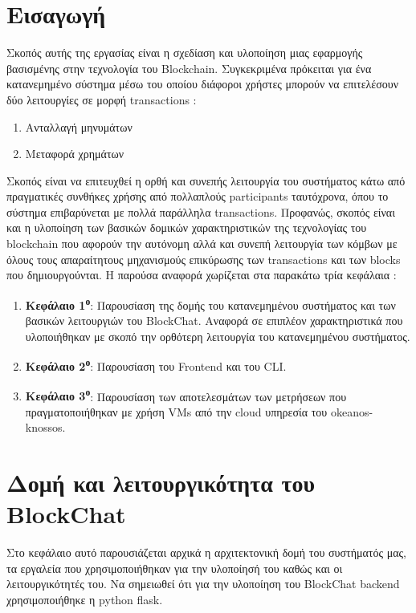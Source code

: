 \documentclass[12pt, a4paper]{article}
\begin{document}
	\section*{Εισαγωγή}
	Σκοπός αυτής της εργασίας είναι η σχεδίαση και υλοποίηση μιας εφαρμογής βασισμένης στην τεχνολογία του Blockchain. Συγκεκριμένα πρόκειται για ένα κατανεμημένο σύστημα μέσω του οποίου διάφοροι χρήστες μπορούν να επιτελέσουν δύο λειτουργίες σε μορφή transactions : 
	\begin{enumerate}
		\item Ανταλλαγή μηνυμάτων 
		\item Μεταφορά χρημάτων
	\end{enumerate}
	Σκοπός είναι να επιτευχθεί η ορθή και συνεπής λειτουργία του συστήματος κάτω από πραγματικές συνθήκες χρήσης από πολλαπλούς participants ταυτόχρονα, όπου το σύστημα επιβαρύνεται με πολλά παράλληλα transactions. Προφανώς, σκοπός είναι και η υλοποίηση των βασικών δομικών χαρακτηριστικών της τεχνολογίας του blockchain που αφορούν την αυτόνομη αλλά και συνεπή λειτουργία των κόμβων με όλους τους απαραίτητους μηχανισμούς επικύρωσης των transactions και των blocks που δημιουργούνται.
	Η παρούσα αναφορά χωρίζεται στα παρακάτω τρία κεφάλαια :
	\begin{enumerate}
		\item \textbf{Κεφάλαιο 1\textsuperscript{ο}}: Παρουσίαση της δομής του κατανεμημένου συστήματος και των βασικών λειτουργιών του BlockChat. Αναφορά σε επιπλέον χαρακτηριστικά που υλοποιήθηκαν με σκοπό την ορθότερη λειτουργία του κατανεμημένου συστήματος.
		\item \textbf{Κεφάλαιο 2\textsuperscript{ο}}: Παρουσίαση του Frontend και του CLI. 
		\item \textbf{Κεφάλαιο 3\textsuperscript{ο}}: Παρουσίαση των αποτελεσμάτων των μετρήσεων που πραγματοποιήθηκαν με χρήση VMs από την cloud υπηρεσία του okeanos-knossos.
	\end{enumerate}
	\section{Δομή και λειτουργικότητα του BlockChat}
	Στο κεφάλαιο αυτό παρουσιάζεται αρχικά η αρχιτεκτονική δομή του συστήματός μας, τα εργαλεία που χρησιμοποιήθηκαν για την υλοποίησή του καθώς και οι λειτουργικότητές του. Να σημειωθεί ότι για την υλοποίηση του BlockChat backend χρησιμοποιήθηκε η python flask.
\end{document}
